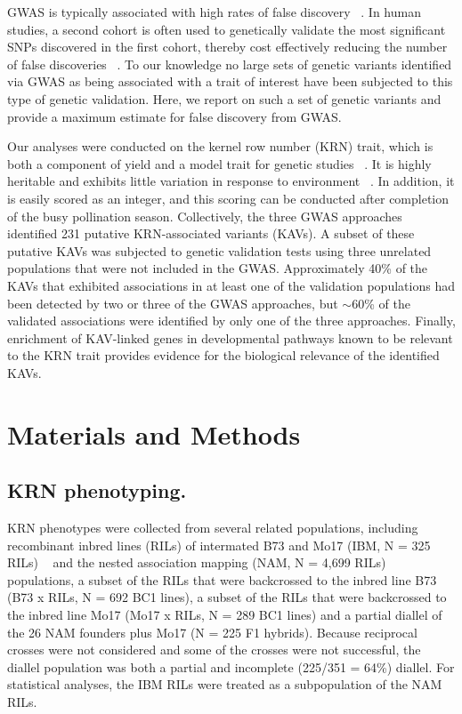 \documentclass[10pt,letterpaper]{article}
\begin{document}
GWAS is typically associated with high rates of false discovery ~\cite{Visscher2012}. In human studies, a second cohort is often used to genetically validate the most significant SNPs discovered in the first cohort, thereby cost effectively reducing the number of false discoveries ~\cite{Sladek2007}. To our knowledge no large sets of genetic variants identified via GWAS as being associated with a trait of interest have been subjected to this type of genetic validation. Here, we report on such a set of genetic variants and provide a maximum estimate for false discovery from GWAS.  

Our analyses were conducted on the kernel row number (KRN) trait, which is both a component of yield and a model trait for genetic studies ~\cite{hallauer2010quantitative}. It is highly heritable and exhibits little variation in response to environment ~\cite{Lu2011}. In addition, it is easily scored as an integer, and this scoring can be conducted after completion of the busy pollination season. Collectively, the three GWAS approaches identified 231 putative KRN-associated variants (KAVs). A subset of these putative KAVs was subjected to genetic validation tests using three unrelated populations that were not included in the GWAS. Approximately 40\% of the KAVs that exhibited associations in at least one of the validation populations had been detected by two or three of the GWAS approaches, but $\sim$60\% of the validated associations were identified by only one of the three approaches. Finally, enrichment of KAV-linked genes in developmental pathways known to be relevant to the KRN trait provides evidence for the biological relevance of the identified KAVs. 



\section*{Materials and Methods}
\subsection*{KRN phenotyping.}

KRN phenotypes were collected from several related populations, including recombinant inbred lines (RILs) of intermated B73 and Mo17 (IBM, N = 325 RILs) ~\cite{Lee2002} and the nested association mapping (NAM, N = 4,699 RILs) ~\cite{Yu2008} populations, a subset of the RILs that were backcrossed to the inbred line B73 (B73 x RILs, N = 692 BC1 lines), a subset of the RILs that were backcrossed to the inbred line Mo17 (Mo17 x RILs, N = 289 BC1 lines) and a partial diallel of the 26 NAM founders plus Mo17 (N = 225 F1 hybrids). Because reciprocal crosses were not considered and some of the crosses were not successful, the diallel population was both a partial and incomplete (225/351 = 64\%) diallel. For statistical analyses, the IBM RILs were treated as a subpopulation of the NAM RILs.
\end{document}
